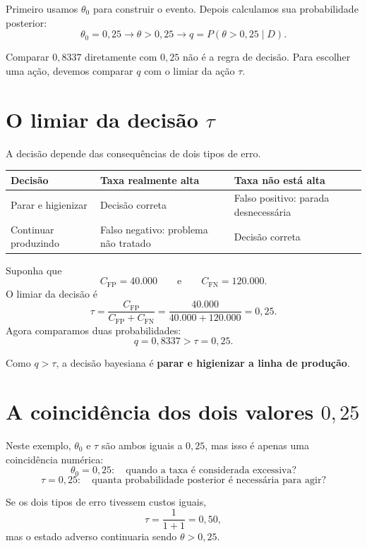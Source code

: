 \documentclass[11pt,letter]{article}
\newcommand{\CFP}{C_{\mathrm{FP}}}
\newcommand{\CFN}{C_{\mathrm{FN}}}
\begin{document}
Primeiro usamos $\theta_0$ para construir o evento. Depois calculamos sua
probabilidade posterior:
\[
\theta_0=0{,}25
\longrightarrow
\theta>0{,}25
\longrightarrow
q=P(\theta>0{,}25\mid D).
\]

\begin{atencao}
Comparar $0{,}8337$ diretamente com $0{,}25$ não é a regra de decisão.
Para escolher uma ação, devemos comparar $q$ com o limiar da ação $\tau$.
\end{atencao}
\section{O limiar da decisão $\tau$}

A decisão depende das consequências de dois tipos de erro.

\begin{center}
\begin{tabular}{p{3.8cm}p{4.8cm}p{4.8cm}}
\toprule
Decisão & Taxa realmente alta & Taxa não está alta \\
\midrule
Parar e higienizar
& Decisão correta
& Falso positivo: parada desnecessária \\
Continuar produzindo
& Falso negativo: problema não tratado
& Decisão correta \\
\bottomrule
\end{tabular}
\end{center}

Suponha que
\[
\CFP=40{.}000
\qquad\text{e}\qquad
\CFN=120{.}000.
\]
O limiar da decisão é
\[
\tau
=\frac{\CFP}{\CFP+\CFN}
=\frac{40{.}000}{40{.}000+120{.}000}
=0{,}25.
\]
Agora comparamos duas probabilidades:
\[
q=0{,}8337>\tau=0{,}25.
\]

\begin{ideia}
Como $q>\tau$, a decisão bayesiana é \textbf{parar e higienizar a linha de
produção}.
\end{ideia}

\section{A coincidência dos dois valores $0{,}25$}

Neste exemplo, $\theta_0$ e $\tau$ são ambos iguais a $0{,}25$, mas isso é
apenas uma coincidência numérica:
\[
\theta_0=0{,}25:
\quad
\text{quando a taxa é considerada excessiva?}
\]
\[
\tau=0{,}25:
\quad
\text{quanta probabilidade posterior é necessária para agir?}
\]

Se os dois tipos de erro tivessem custos iguais,
\[
\tau=\frac{1}{1+1}=0{,}50,
\]
mas o estado adverso continuaria sendo $\theta>0{,}25$.
\end{document}
